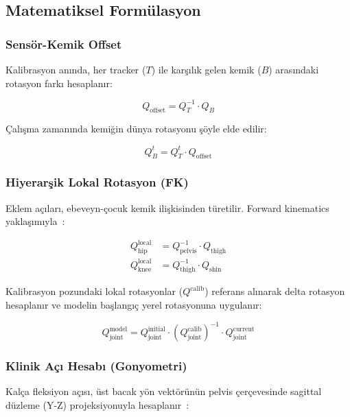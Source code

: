 \documentclass[11pt,a4paper]{article}
\begin{document}
\subsection{Matematiksel Form\"ulasyon}

\subsubsection{Sens\"or-Kemik Offset}
Kalibrasyon an{\i}nda, her tracker ($T$) ile kar\c{s}{\i}l{\i}k gelen kemik ($B$)
aras{\i}ndaki rotasyon fark{\i} hesaplan{\i}r:

\begin{equation}
    Q_{\text{offset}} = Q_{T}^{-1} \cdot Q_{B}
    \label{eq:offset}
\end{equation}

\c{C}al{\i}\c{s}ma zaman{\i}nda kemi\u{g}in d\"unya rotasyonu \c{s}\"oyle elde edilir:

\begin{equation}
    Q_{B}^{t} = Q_{T}^{t} \cdot Q_{\text{offset}}
    \label{eq:runtime}
\end{equation}

\subsubsection{Hiyerar\c{s}ik Lokal Rotasyon (FK)}
Eklem a\c{c}{\i}lar{\i}, ebeveyn-\c{c}ocuk kemik ili\c{s}kisinden t\"uretilir. Forward
kinematics yakla\c{s}{\i}m{\i}yla~\cite{craig2005}:

\begin{align}
    Q_{\text{hip}}^{\text{local}} &= Q_{\text{pelvis}}^{-1} \cdot Q_{\text{thigh}} \label{eq:hip} \\
    Q_{\text{knee}}^{\text{local}} &= Q_{\text{thigh}}^{-1} \cdot Q_{\text{shin}} \label{eq:knee}
\end{align}

Kalibrasyon pozundaki lokal rotasyonlar ($Q^{\text{calib}}$) referans
al{\i}narak delta rotasyon hesaplan{\i}r ve modelin ba\c{s}lang{\i}\c{c} yerel
rotasyonuna uygulan{\i}r:

\begin{equation}
    Q_{\text{joint}}^{\text{model}} = Q_{\text{joint}}^{\text{initial}} \cdot
    \left(Q_{\text{joint}}^{\text{calib}}\right)^{-1} \cdot Q_{\text{joint}}^{\text{current}}
    \label{eq:delta}
\end{equation}

\subsubsection{Klinik A\c{c}{\i} Hesab{\i} (Gonyometri)}
Kal\c{c}a fleksiyon a\c{c}{\i}s{\i}, \"ust bacak y\"on vekt\"or\"un\"un pelvis \c{c}er\c{c}evesinde
sagittal d\"uzleme (Y-Z) projeksiyonuyla hesaplan{\i}r~\cite{norkin2016}:
\end{document}
